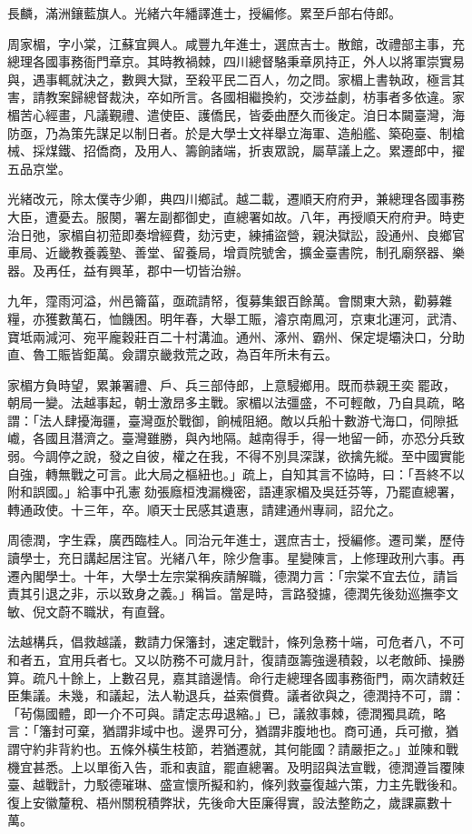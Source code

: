 \begin{pinyinscope}
長麟，滿洲鑲藍旗人。光緒六年繙譯進士，授編修。累至戶部右侍郎。

周家楣，字小棠，江蘇宜興人。咸豐九年進士，選庶吉士。散館，改禮部主事，充總理各國事務衙門章京。其時教禍棘，四川總督駱秉章夙持正，外人以將軍崇實易與，遇事輒就決之，數興大獄，至殺平民二百人，勿之問。家楣上書執政，極言其害，請教案歸總督裁決，卒如所言。各國相繼換約，交涉益劇，枋事者多依違。家楣苦心經畫，凡議覲禮、遣使臣、護僑民，皆委曲歷久而後定。洎日本闚臺灣，海防亟，乃為策先謀足以制日者。於是大學士文祥舉立海軍、造船艦、築砲臺、制槍械、採煤鐵、招僑商，及用人、籌餉諸端，折衷眾說，屬草議上之。累遷郎中，擢五品京堂。

光緒改元，除太僕寺少卿，典四川鄉試。越二載，遷順天府府尹，兼總理各國事務大臣，遭憂去。服闋，署左副都御史，直總署如故。八年，再授順天府府尹。時吏治日弛，家楣自初蒞即奏增經費，劾污吏，練捕盜營，親決獄訟，設通州、良鄉官車局、近畿教養義塾、善堂、留養局，增貢院號舍，擴金臺書院，制孔廟祭器、樂器。及再任，益有興革，郡中一切皆治辦。

九年，霪雨河溢，州邑籥菑，亟疏請帑，復募集銀百餘萬。會關東大熟，勸募雜糧，亦獲數萬石，恤饑困。明年春，大舉工賑，濬京南鳳河，京東北運河，武清、寶坻兩減河、宛平龐穀莊百二十村溝洫。通州、涿州、霸州、保定堤壩決口，分助直、魯工賑皆鉅萬。僉謂京畿救荒之政，為百年所未有云。

家楣方負時望，累兼署禮、戶、兵三部侍郎，上意駸鄉用。既而恭親王奕罷政，朝局一變。法越事起，朝士激昂多主戰。家楣以法彊盛，不可輕敵，乃自具疏，略謂：「法人肆擾海疆，臺灣亟於戰御，餉械阻絕。敵以兵船十數游弋海口，伺隙抵巇，各國且潛濟之。臺灣雖勝，與內地隔。越南得手，得一地留一師，亦恐分兵致弱。今調停之說，發之自彼，權之在我，不得不別具深謀，欲擒先縱。至中國實能自強，轉無戰之可言。此大局之樞紐也。」疏上，自知其言不協時，曰：「吾終不以附和誤國。」給事中孔憲劾張廕桓洩漏機密，語連家楣及吳廷芬等，乃罷直總署，轉通政使。十三年，卒。順天士民感其遺惠，請建通州專祠，詔允之。

周德潤，字生霖，廣西臨桂人。同治元年進士，選庶吉士，授編修。遷司業，歷侍讀學士，充日講起居注官。光緒八年，除少詹事。星變陳言，上修理政刑六事。再遷內閣學士。十年，大學士左宗棠稱疾請解職，德潤力言：「宗棠不宜去位，請旨責其引退之非，示以致身之義。」稱旨。當是時，言路發攄，德潤先後劾巡撫李文敏、倪文蔚不職狀，有直聲。

法越構兵，倡救越議，數請力保籓封，速定戰計，條列急務十端，可危者八，不可和者五，宜用兵者七。又以防務不可歲月計，復請亟籌強邊積穀，以老敵師、操勝算。疏凡十餘上，上數召見，嘉其諳邊情。命行走總理各國事務衙門，兩次請敕廷臣集議。未幾，和議起，法人勒退兵，益索償費。議者欲與之，德潤持不可，謂：「茍傷國體，即一介不可與。請定志毋退縮。」已，議敘事棘，德潤獨具疏，略言：「籓封可棄，猶謂非域中也。邊界可分，猶謂非腹地也。商可通，兵可撤，猶謂守約非背約也。五條外橫生枝節，若猶遷就，其何能國？請嚴拒之。」並陳和戰機宜甚悉。上以單銜入告，乖和衷誼，罷直總署。及明詔與法宣戰，德潤遵旨覆陳臺、越戰計，力駁德璀琳、盛宣懷所擬和約，條列救臺復越六策，力主先戰後和。復上安徽釐稅、梧州關稅積弊狀，先後命大臣廉得實，設法整飭之，歲課贏數十萬。


\end{pinyinscope}
